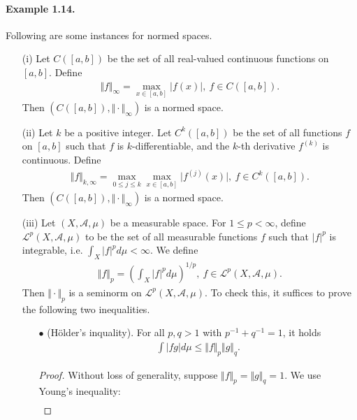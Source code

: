 \documentclass{article}
\begin{document}
\paragraph{Example 1.14.\label{example:1.14}} Following are some instances for normed spaces.
\vspace{0.1cm}
\begin{itemize}
\item[(i)] Let $C([a,b])$ be the set of all real-valued continuous functions on $[a,b]$. Define
\begin{align*}
	\Vert f\Vert_\infty = \max_{x\in[a,b]} \vert f(x)\vert,\ f\in C([a,b]).
\end{align*}
Then $(C([a,b]),\Vert\cdot\Vert_\infty)$ is a normed space.
\vspace{0.1cm}
\item[(ii)] Let $k$ be a positive integer. Let $C^k([a,b])$ be the set of all functions $f$ on $[a,b]$ such that $f$ is $k$-differentiable, and the $k$-th derivative $f^{(k)}$ is continuous. Define
\begin{align*}
	\Vert f\Vert_{k,\infty} = \max_{0\leq j\leq k}\max_{x\in[a,b]} \vert f^{(j)}(x)\vert,\ f\in C^k([a,b]).
\end{align*}
Then $(C([a,b]),\Vert\cdot\Vert_\infty)$ is a normed space.
\vspace{0.1cm}
\item[(iii)] Let $(X,\mathscr{A},\mu)$ be a measurable space. For $1\leq p<\infty$, define $\mathcal{L}^p(X,\mathscr{A},\mu)$ to be the set of all measurable functions $f$ such that $\vert f\vert^p$ is integrable, i.e. $\int_X\vert f\vert^p d\mu < \infty$. We define
\begin{align*}
	\Vert f\Vert_p = \left(\int_X\vert f\vert^p d\mu\right)^{1/p},\ f\in\mathcal{L}^p(X,\mathscr{A},\mu).
\end{align*}
Then $\Vert\cdot\Vert_p$ is a seminorm on $\mathcal{L}^p(X,\mathscr{A},\mu)$. To check this, it suffices to prove the following two inequalities.
\begin{itemize}
	\item[$\bullet$] (Hölder's inquality). For all $p,q>1$ with $p^{-1}+q^{-1}=1$, it holds
	\begin{align*}
		\int\left\vert fg\right\vert d\mu \leq \Vert f\Vert_p\Vert g\Vert_q.
	\end{align*}
    \begin{proof}
    Without loss of generality, suppose $\Vert f\Vert_p=\Vert g\Vert_q = 1$. We use Young's inequality:
    \begin{align*}

\end{align*}
\end{proof}
\end{itemize}
\end{itemize}
\end{document}
